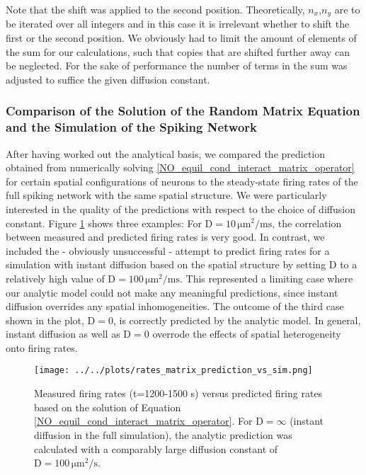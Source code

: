 \documentclass[10pt,a4paper]{article}
\begin{document}
Note that the shift was applied to the second position. Theoretically, $n_x$,$n_y$ are to be iterated over all integers and in this case it is irrelevant whether to shift the first or the second position. We obviously had to limit the amount of elements of the sum for our calculations, such that copies that are shifted further away can be neglected. For the sake of performance the number of terms in the sum was adjusted to suffice the given diffusion constant.

\subsubsection{Comparison of the Solution of the Random Matrix Equation and the Simulation of the Spiking Network}\label{Section_Rand_Mat_vs_Sim}
After having worked out the analytical basis, we compared the prediction obtained from numerically solving \eqref{NO_equil_cond_interact_matrix_operator} for certain spatial configurations of neurons to the steady-state firing rates of the full spiking network with the same spatial structure. We were particularly interested in the quality of the predictions with respect to the choice of diffusion constant. Figure \ref{Rand_Matrix_Sol_vs_Sim} shows three examples: For $\mathrm{D=10\, \mu m^2 /ms}$, the correlation between measured and predicted firing rates is very good. In contrast, we included the - obviously unsuccessful - attempt to predict firing rates for a simulation with instant diffusion based on the spatial structure by setting D to a relatively high value of $\mathrm{D=100\, \mu m^2 /ms}$. This represented a limiting case where our analytic model could not make any meaningful predictions, since instant diffusion overrides any spatial inhomogeneities. The outcome of the third case shown in the plot, $\mathrm{D=0}$, is correctly predicted by the analytic model. In general, instant diffusion as well as $\mathrm{D=0}$ overrode the effects of spatial heterogeneity onto firing rates. 
\begin{figure}
\texttt{[image: ../../plots/rates\_matrix\_prediction\_vs\_sim.png]}
\caption{Measured firing rates (t=1200-1500 s) versus predicted firing rates based on the solution of Equation \eqref{NO_equil_cond_interact_matrix_operator}. For $\mathrm{D=\infty}$ (instant diffusion in the full simulation), the analytic prediction was calculated with a comparably large diffusion constant of $\mathrm{D=100\, \mu m^2 /s}$.}
\label{Rand_Matrix_Sol_vs_Sim}
\end{figure}
\end{document}
